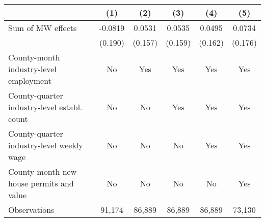 {
\def\sym#1{\ifmmode^{#1}\else\(^{#1}\)\fi}
\begin{tabular}{l*{5}{c}}
\hline\hline
          &\multicolumn{1}{c}{(1)}         &\multicolumn{1}{c}{(2)}         &\multicolumn{1}{c}{(3)}         &\multicolumn{1}{c}{(4)}         &\multicolumn{1}{c}{(5)}         \\
\hline
Sum of MW effects&  -0.0819         &   0.0531         &   0.0535         &   0.0495         &   0.0734         \\
          &  (0.190)         &  (0.157)         &  (0.159)         &  (0.162)         &  (0.176)         \\
\hline
County-month industry-level employment&       No         &      Yes         &      Yes         &      Yes         &      Yes         \\
County-quarter industry-level establ. count&       No         &       No         &      Yes         &      Yes         &      Yes         \\
County-quarter industry-level weekly wage&       No         &       No         &       No         &      Yes         &      Yes         \\
County-month new house permits and value&       No         &       No         &       No         &       No         &      Yes         \\
Observations&   91,174         &   86,889         &   86,889         &   86,889         &   73,130         \\
\hline\hline
\end{tabular}
}
